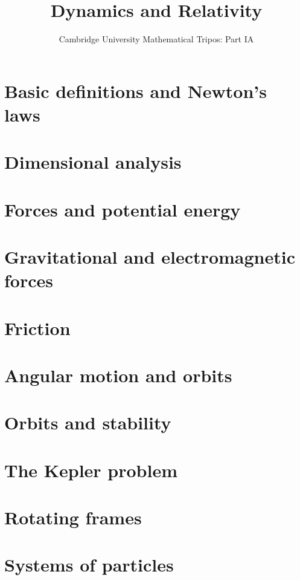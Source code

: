 \documentclass{article}
\title{Dynamics and Relativity}
\author{Cambridge University Mathematical Tripos: Part IA}
\begin{document}
\maketitle

\tableofcontentsnewpage{}

\section{Basic definitions and Newton's laws}

\section{Dimensional analysis}

\section{Forces and potential energy}

\section{Gravitational and electromagnetic forces}

\section{Friction}

\section{Angular motion and orbits}

\section{Orbits and stability}

\section{The Kepler problem}

\section{Rotating frames}

\section{Systems of particles}

\end{document}
